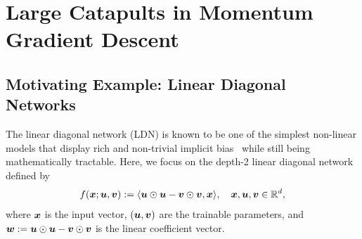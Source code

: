 \section{Large Catapults in Momentum Gradient Descent}
\label{sec:catapults}

\subsection{Motivating Example: Linear Diagonal Networks}
\label{sec:ldn}

The linear diagonal network (LDN) is known to be one of the simplest non-linear models that display rich and non-trivial implicit bias~\citep{woodworth2020kernel} while still being mathematically tractable.
Here, we focus on the depth-2 linear diagonal network defined by
\begin{equation}
    f({\bm{x}}; {\bm{u}}, {\bm{v}}) := \langle {\bm{u}} \odot {\bm{u}} - {\bm{v}} \odot {\bm{v}}, {\bm{x}} \rangle 
    , \quad {\bm{x}}, {\bm{u}}, {\bm{v}} \in {\mathbb{R}}^d,
\end{equation}
where ${\bm{x}}$ is the input vector, $({\bm{u}}, {\bm{v}})$ are the trainable parameters, and ${\bm{w}} := {\bm{u}} \odot {\bm{u}} - {\bm{v}} \odot {\bm{v}}$ is the linear coefficient vector.

